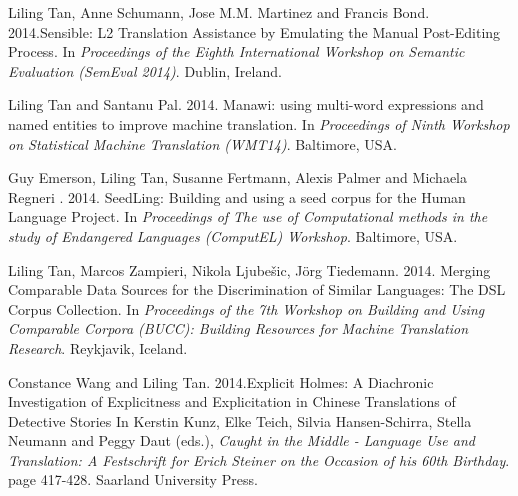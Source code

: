 {Liling Tan, Anne Schumann, Jose M.M. Martinez and Francis Bond. 2014.Sensible: L2 Translation Assistance by Emulating the Manual Post-Editing Process. In \textit{Proceedings of the Eighth International Workshop on Semantic Evaluation (SemEval 2014)}. Dublin, Ireland.  

Liling Tan and Santanu Pal. 2014. Manawi: using multi-word expressions and named entities to improve machine translation. In \textit{Proceedings of Ninth Workshop on Statistical Machine Translation (WMT14)}. Baltimore, USA.  

Guy Emerson, Liling Tan, Susanne Fertmann, Alexis Palmer and Michaela Regneri . 2014. SeedLing: Building and using a seed corpus for the Human Language Project. In \textit{Proceedings of The use of Computational methods in the study of Endangered Languages (ComputEL) Workshop}. Baltimore, USA.  

Liling Tan, Marcos Zampieri, Nikola Ljubešic, Jörg Tiedemann. 2014. Merging Comparable Data Sources for the Discrimination of Similar Languages: The DSL Corpus Collection. In \textit{Proceedings of the 7th Workshop on Building and Using Comparable Corpora (BUCC): Building Resources for Machine Translation Research}. Reykjavik, Iceland.

Constance Wang and Liling Tan. 2014.Explicit Holmes: A Diachronic Investigation of Explicitness and Explicitation in Chinese Translations of Detective Stories In Kerstin Kunz, Elke Teich, Silvia Hansen-Schirra, Stella Neumann and Peggy Daut (eds.), \textit{Caught in the Middle - Language Use and Translation: A Festschrift for Erich Steiner on the Occasion of his 60th Birthday}. page 417-428. Saarland University Press. 

}
\fi